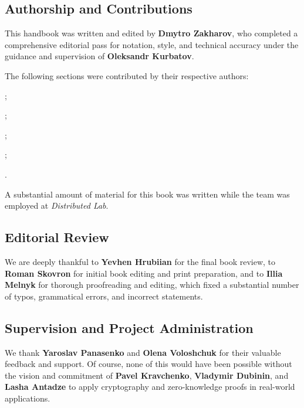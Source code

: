 \documentclass[../../book.tex]{subfiles}
\begin{document}
\subsection*{Authorship and Contributions} 
This handbook was written and edited by \textbf{Dmytro Zakharov}, who completed a comprehensive editorial pass for notation, style, and technical accuracy under the guidance and supervision of \textbf{Oleksandr Kurbatov}.

The following sections were contributed by their respective authors:
\begin{description}[font=\bfseries, labelwidth=3.2cm, leftmargin=3.4cm, align=left]
    \item[Anton Levochko] ;
    \item[Yevhen Hrubiian] ;
    \item[Nikita Masych] ;
    \item[Denis Riabtsev] ;
    \item[Kyrylo Riabov] .
\end{description}

A substantial amount of material for this book was written while the team was employed at \textit{Distributed Lab}.

\subsection*{Editorial Review} 
We are deeply thankful to \textbf{Yevhen Hrubiian} for the final book review,
to \textbf{Roman Skovron} for initial book editing and print preparation,
and to \textbf{Illia Melnyk} for thorough proofreading and editing, which fixed a substantial number of typos, grammatical errors, and incorrect statements.

\subsection*{Supervision and Project Administration} 
We thank \textbf{Yaroslav Panasenko} and \textbf{Olena Voloshchuk} for their valuable feedback and support.
Of course, none of this would have been possible without the vision and commitment of \textbf{Pavel Kravchenko}, \textbf{Vladymir Dubinin}, and \textbf{Lasha Antadze} to apply cryptography and zero-knowledge proofs in real-world applications.
\end{document}
